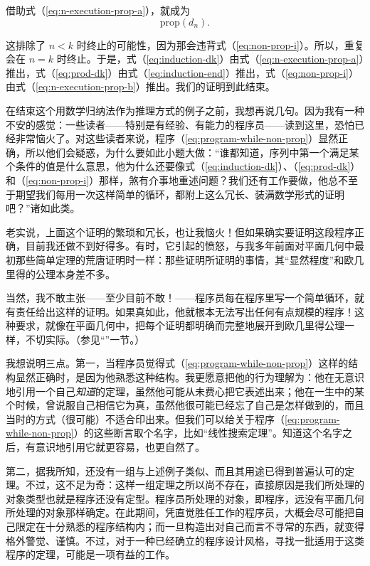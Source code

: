 \documentclass[twoside,11pt,fontset=none]{ctexbook}
\begin{document}
\noindent
借助式（\ref{eq:n-execution-prop-a}），就成为
\begin{equation}
	\label{eq:induction-end}
	\text{prop}(d_n).
\end{equation}

这排除了 $n < k$ 时终止的可能性，因为那会违背式（\ref{eq:non-prop-i}）。所以，重复会在 $n = k$ 时终止。于是，式（\ref{eq:induction-dk}）由式（\ref{eq:n-execution-prop-a}）推出，式（\ref{eq:prod-dk}）由式（\ref{eq:induction-end}）推出，式（\ref{eq:non-prop-i}）由式（\ref{eq:n-execution-prop-b}）推出。我们的证明到此结束。

在结束这个用数学归纳法作为推理方式的例子之前，我想再说几句。因为我有一种不安的感觉：一些读者——特别是有经验、有能力的程序员——读到这里，恐怕已经非常恼火了。对这些读者来说，程序（\ref{eq:program-while-non-prop}）显然正确，所以他们会疑惑，为什么要如此小题大做：“谁都知道，序列中第一个满足某个条件的值是什么意思，他为什么还要像式（\ref{eq:induction-dk}）、（\ref{eq:prod-dk}）和（\ref{eq:non-prop-i}）那样，煞有介事地重述问题？我们还有工作要做，他总不至于期望我们每用一次这样简单的循环，都附上这么冗长、装满数学形式的证明吧？”诸如此类。

老实说，上面这个证明的繁琐和冗长，也让我恼火！但如果确实要证明这段程序正确，目前我还做不到好得多。有时，它引起的愤怒，与我多年前面对平面几何中最初那些简单定理的荒唐证明时一样：那些证明所证明的事情，其“显然程度”和欧几里得的公理本身差不多。

当然，我不敢主张——至少目前不敢！——程序员每在程序里写一个简单循环，就有责任给出这样的证明。如果真如此，他就根本无法写出任何有点规模的程序！这种要求，就像在平面几何中，把每个证明都明确而完整地展开到欧几里得公理一样，不切实际。（参见“”一节。）

我想说明三点。第一，当程序员觉得式（\ref{eq:program-while-non-prop}）这样的结构显然正确时，是因为他熟悉这种结构。我更愿意把他的行为理解为：他在无意识地引用一个自己\textit{知道}的定理，虽然他可能从未费心把它表述出来；他在一生中的某个时候，曾说服自己相信它为真，虽然他很可能已经忘了自己是怎样做到的，而且当时的方式（很可能）不适合印出来。但我们可以给关于程序（\ref{eq:program-while-non-prop}）的这些断言取个名字，比如“线性搜索定理”。知道这个名字之后，有意识地引用它就更容易，也更自然了。

第二，据我所知，还没有一组与上述例子类似、而且其用途已得到普遍认可的定理。不过，这不足为奇：这样一组定理之所以尚不存在，直接原因是我们所处理的对象类型\textemdash{}也就是程序\textemdash{}还没有定型。程序员所处理的对象，即程序，远没有平面几何所处理的对象那样确定。在此期间，凭直觉胜任工作的程序员，大概会尽可能把自己限定在十分熟悉的程序结构内；而一旦构造出对自己而言不寻常的东西，就变得格外警觉、谨慎。不过，对于一种已经确立的程序设计风格，寻找一批适用于这类程序的定理，可能是一项有益的工作。
\end{document}
